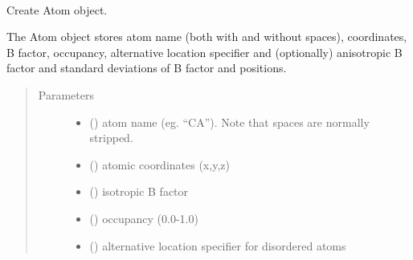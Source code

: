 \documentclass[a4paper,10pt,english,openany,oneside]{sphinxmanual}
\begin{document}
\begin{fulllineitems}
\label{\detokenize{reference/generated/paramagpy.protein.CustomAtom:paramagpy.protein.CustomAtom}}~

\begin{fulllineitems}
\label{\detokenize{reference/generated/paramagpy.protein.CustomAtom:paramagpy.protein.CustomAtom.__init__}}
Create Atom object.

The Atom object stores atom name (both with and without spaces),
coordinates, B factor, occupancy, alternative location specifier
and (optionally) anisotropic B factor and standard deviations of
B factor and positions.
\begin{quote}\begin{description}
\item[{Parameters}] \leavevmode\begin{itemize}
\item {} 
 () \textendash{} atom name (eg. “CA”). Note that spaces are normally stripped.

\item {} 
 (\sphinxstyleliteralemphasis{\sphinxupquote{ (}}\sphinxstyleliteralemphasis{\sphinxupquote{, }}\sphinxstyleliteralemphasis{\sphinxupquote{)}}) \textendash{} atomic coordinates (x,y,z)

\item {} 
 () \textendash{} isotropic B factor

\item {} 
 () \textendash{} occupancy (0.0-1.0)

\item {} 
 () \textendash{} alternative location specifier for disordered atoms


\end{itemize}
\end{description}
\end{quote}
\end{fulllineitems}
\end{fulllineitems}
\end{document}
